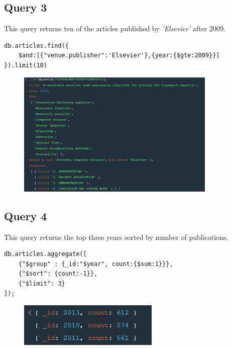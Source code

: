 \documentclass{Configuration_Files/PoliMi3i_thesis}
\begin{document}
\subsection{Query 3}
This query returns ten of the articles published by \emph{'Elsevier'} after 2009.
\begin{lstlisting}
db.articles.find({
	$and:[{"venue.publisher":'Elsevier'},{year:{$gte:2009}}]
}).limit(10)
\end{lstlisting}
\begin{figure}[H]
\centering
\includegraphics[width=0.85\textwidth]{query/mongo_q3.PNG}
\label{fig:query3}
\end{figure}

\subsection{Query 4}
This query returns the top three years sorted by number of publications.
\begin{lstlisting}
db.articles.aggregate([
	{"$group" : {_id:"$year", count:{$sum:1}}},
	{"$sort": {count:-1}},
	{"$limit": 3}
]);
\end{lstlisting}
\begin{figure}[H]
\centering
\includegraphics[width=0.6\textwidth]{query/mongo_q4.PNG}
\label{fig:query4}
\end{figure}
\end{document}
